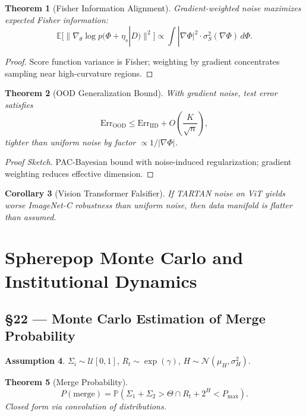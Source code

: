 \documentclass[11pt]{article}
\newtheorem{theorem}{Theorem}[section]
\newtheorem{corollary}[theorem]{Corollary}
\theoremstyle{definition}
\newtheorem{assumption}[theorem]{Assumption}
\theoremstyle{remark}
\begin{document}
\begin{theorem}[Fisher Information Alignment]
Gradient-weighted noise maximizes expected Fisher information:
\[
\mathbb{E}[\|\nabla_\theta \log p(\Phi + \eta_s | D)\|^2] \propto \int |\nabla \Phi|^2 \cdot \sigma_S^2(\nabla \Phi)\,d\Phi.
\]
\end{theorem}

\begin{proof}
Score function variance is Fisher; weighting by gradient concentrates sampling near high-curvature regions.
\end{proof}

\begin{theorem}[OOD Generalization Bound]
With gradient noise, test error satisfies
\[
\text{Err}_{\text{OOD}} \le \text{Err}_{\text{IID}} + O\left( \frac{K}{\sqrt{n}} \right),
\]
tighter than uniform noise by factor $\propto 1/|\nabla \Phi|$.
\end{theorem}

\begin{proof}[Proof Sketch]
PAC-Bayesian bound with noise-induced regularization; gradient weighting reduces effective dimension.
\end{proof}

\begin{corollary}[Vision Transformer Falsifier]
If TARTAN noise on ViT yields worse ImageNet-C robustness than uniform noise, then data manifold is flatter than assumed.
\end{corollary}

\section{Spherepop Monte Carlo and Institutional Dynamics}

\subsection*{§22 — Monte Carlo Estimation of Merge Probability}

\begin{assumption}
\label{ass:spherepop_mc}
$\Sigma_i \sim \mathcal{U}[0,1]$, $R_t \sim \exp(\gamma)$, $H \sim \mathcal{N}(\mu_H, \sigma_H^2)$.
\end{assumption}

\begin{theorem}[Merge Probability]
\[
P(\text{merge}) = \mathbb{P}(\Sigma_1 + \Sigma_2 > \Theta \cap R_t + 2^H < P_{\max}).
\]
Closed form via convolution of distributions.
\end{theorem}
\end{document}
